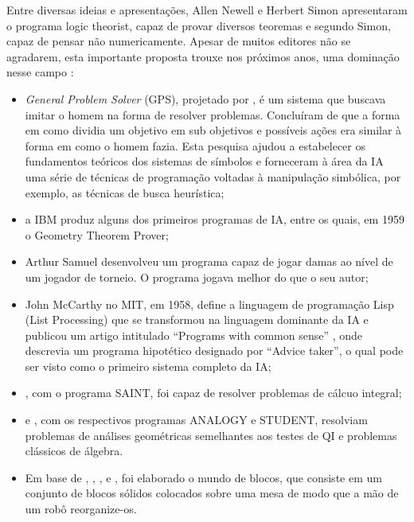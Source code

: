 \documentclass[
  openany]{book}
\begin{document}
Entre diversas ideias e apresentações, Allen Newell e Herbert Simon apresentaram o programa logic theorist, capaz de provar diversos teoremas e segundo Simon, capaz de pensar não numericamente. Apesar de muitos editores não se agradarem, esta importante proposta trouxe nos próximos anos, uma dominação nesse campo \citep{russel2004inteligencia}:

\begin{itemize}
\item
  \emph{General Problem Solver} (GPS), projetado por \citet{newell1959variety}, é um sistema que buscava imitar o homem na forma de resolver problemas. Concluíram de que a forma em como dividia um objetivo em sub objetivos e possíveis ações era similar à forma em como o homem fazia. Esta pesquisa ajudou a estabelecer os fundamentos teóricos dos sistemas de símbolos e forneceram à área da IA uma série de técnicas de programação voltadas à manipulação simbólica, por exemplo, as técnicas de busca heurística;
\item
  a IBM produz alguns dos primeiros programas de IA, entre os quais, em 1959 o
  Geometry Theorem Prover;
\item
  Arthur Samuel desenvolveu um programa capaz de jogar damas ao nível de um
  jogador de torneio. O programa jogava melhor do que o seu autor;
\item
  John McCarthy no MIT, em 1958, define a linguagem de programação Lisp (List Processing) que se transformou na linguagem dominante
  da IA e publicou um artigo intitulado ``Programs with common sense'' \citep{mccarthy1968programs},
  onde descrevia um programa hipotético designado por ``Advice taker'', o qual pode
  ser visto como o primeiro sistema completo da IA;
\item
  \citet{slagle1963heuristic}, com o programa SAINT, foi capaz de resolver problemas de cálcuo integral;
\item
  \citet{evans1964program} e \citet{bobrow1967problems}, com os respectivos programas ANALOGY e STUDENT, resolviam problemas de análises geométricas semelhantes aos testes de QI e problemas clássicos de álgebra.
\item
  Em base de \citet{huffman1971impossible}, \citet{waltz1975understanding}, \citet{winograd1972understanding}, \citet{winston1970learning} e \citet{fahlman1974planning}, foi elaborado o mundo de blocos, que consiste em um conjunto de blocos sólidos colocados sobre uma mesa de modo que a mão de um robô reorganize-os.
\end{itemize}
\end{document}
